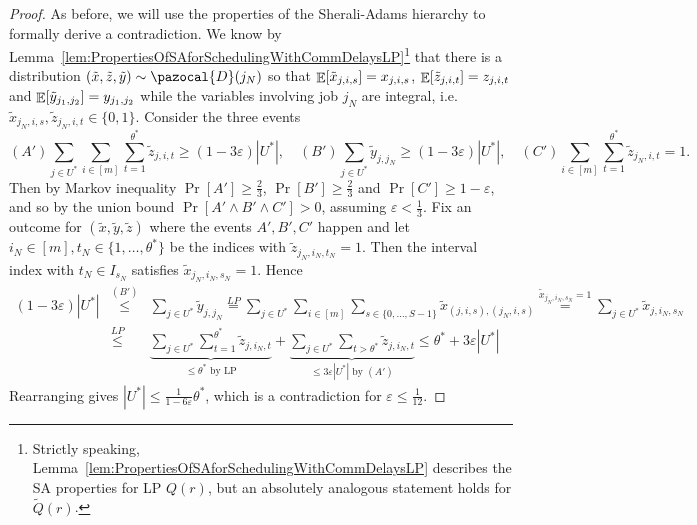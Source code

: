 \begin{proof}
As before, we will use the properties of the Sherali-Adams hierarchy to formally derive a contradiction.
We know by Lemma~\ref{lem:PropertiesOfSAforSchedulingWithCommDelaysLP}\footnote{Strictly speaking, 
Lemma~\ref{lem:PropertiesOfSAforSchedulingWithCommDelaysLP} describes the SA properties for LP $Q(r)$, 
but an absolutely analogous statement holds for $\tilde{Q}(r)$.} that there is a distribution  $(\tilde{x},\tilde{z},\tilde{y}) \sim \pazocal{D}(j_N)$ 
so that $\mathop{\mathbb{E}}[\tilde{x}_{j,i,s}] = x_{j,i,s}$, $\mathop{\mathbb{E}}[\tilde{z}_{j,i,t}]=z_{j,i,t}$ and $\mathop{\mathbb{E}}[\tilde{y}_{j_1,j_2}]=y_{j_1,j_2}$ 
while the variables involving job $j_N$ are integral, i.e.
$\tilde{x}_{j_N,i,s},\tilde{z}_{j_N,i,t} \in \{ 0,1\}$.
Consider the three events
  \[
(A') \sum_{j \in U^*} \sum_{i \in [m]} \sum_{t=1}^{\theta^*} \tilde{z}_{j,i,t} \geq (1-3\varepsilon)|U^*|, \quad (B')  \sum_{j \in U^*} \tilde{y}_{j,j_N} \geq (1-3\varepsilon)|U^*|, \quad   (C') \sum_{i \in [m]} \sum_{t=1}^{\theta^*} \tilde{z}_{j_N,i,t} = 1.
\]
Then by Markov inequality $\Pr[A'] \geq \frac{2}{3}$, $\Pr[B'] \geq \frac{2}{3}$ and $\Pr[C'] \geq 1-\varepsilon$, and so by the union bound
$\Pr[A' \wedge B' \wedge C'] > 0$, assuming $\varepsilon < \frac{1}{3}$.
Fix an outcome for $(\tilde{x},\tilde{y},\tilde{z})$ where the events $A',B',C'$ happen and let $i_N \in [m],t_N \in \{ 1,\ldots,\theta^*\}$ be the indices with $\tilde{z}_{j_N,i_N,t_N}=1$. Then the interval index with $t_N \in I_{s_N}$ satisfies $\tilde{x}_{j_N,i_N,s_N}=1$. Hence
\begin{eqnarray*}
  (1-3\varepsilon) |U^*| &\stackrel{(B')}{\leq}& \sum_{j \in U^*} \tilde{y}_{j,j_N} \stackrel{LP}{=} \sum_{j \in U^*} \sum_{i \in [m]} \sum_{s \in \{ 0,\ldots,S-1\}} \tilde{x}_{(j,i,s),(j_N,i,s)} \stackrel{\tilde{x}_{j_N,i_N,s_N}=1}{=} \sum_{j \in U^*} \tilde{x}_{j,i_N,s_N} \\
  &\stackrel{LP}{\leq}& \underbrace{\sum_{j \in U^*} \sum_{t=1}^{\theta^*} \tilde{z}_{j,i_N,t}}_{\leq \theta^*\textrm{ by LP}} + \underbrace{\sum_{j \in U^*} \sum_{t > \theta^*} \tilde{z}_{j,i_N,t}}_{\leq 3\varepsilon |U^*|\textrm{ by }(A')} \leq \theta^* + 3\varepsilon |U^*|
\end{eqnarray*}
Rearranging gives $|U^*| \leq \frac{1}{1-6\varepsilon} \theta^*$, which is a contradiction for $\varepsilon \leq \frac{1}{12}$.
\end{proof}



